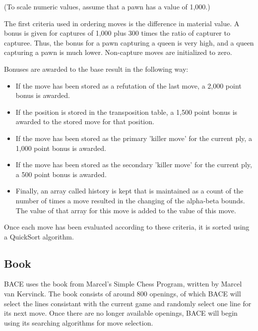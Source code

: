 \documentclass{article}
\begin{document}
(To scale numeric values, assume that a pawn has a value of 1,000.)

The first criteria used in ordering moves is the difference in
material value.  A bonus is given for captures of 1,000 plus 300 times
the ratio of capturer to capturee.  Thus, the bonus for a pawn
capturing a queen is very high, and a queen capturing a pawn is much
lower.  Non-capture moves are initialized to zero.

Bonuses are awarded to the base result in the following way:

\begin{itemize}

\item If the move has been stored as a refutation of the last move,
a 2,000 point bonus is awarded.   

\item If the position is stored in the transposition table, a 1,500
point bonus is awarded to the stored move for that position. 
	
\item If the move has been stored as the primary 'killer move' for
the current ply, a 1,000 point bonus is awarded.

\item If the move has been stored as the secondary 'killer move' for
the current ply, a 500 point bonus is awarded.

\item Finally, an array called history is kept that is maintained as
a count of the number of times a move resulted in the changing of the
alpha-beta bounds.  The value of that array for this move is added to
the value of this move. 

\end{itemize}

Once each move has been evaluated according to these criteria, it is
sorted using a QuickSort algorithm.

\subsection{Book}

BACE uses the book from Marcel's Simple Chess Program, written by
Marcel van Kervinck.  The book consists of around 800 openings, of
which BACE will select the lines consistant with the current game and
randomly select  
one line for its next move.  Once there are no longer available
openings, BACE will begin using its searching algorithms for move
selection.  
\end{document}

